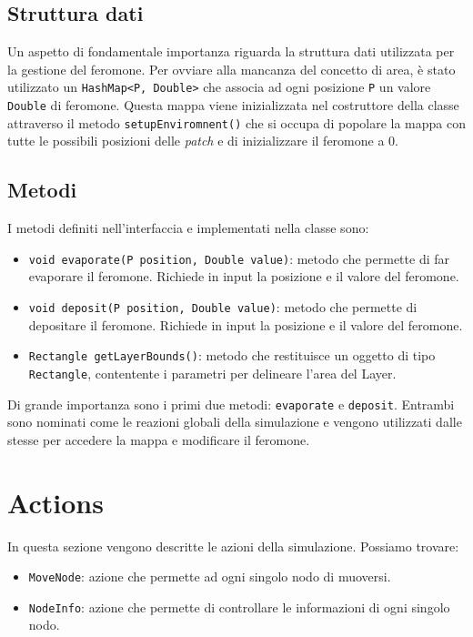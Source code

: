 
\subsection{Struttura dati}\label{strDati}
Un aspetto di fondamentale importanza riguarda la struttura dati utilizzata per la gestione del feromone.
Per ovviare alla mancanza del concetto di area, è stato utilizzato un \texttt{HashMap<P, Double>} che associa ad ogni posizione \texttt{P} un valore \texttt{Double} di feromone.
Questa mappa viene inizializzata nel costruttore della classe attraverso il metodo \texttt{setupEnviromnent()} che si occupa di popolare la mappa
con tutte le possibili posizioni delle \textit{patch} e di inizializzare il feromone a 0.\newline



\subsection{Metodi}
I metodi definiti nell'interfaccia e implementati nella classe sono:
\begin{itemize}
    \item \texttt{void evaporate(P position, Double value)}: metodo che permette di far evaporare il feromone. 
    Richiede in input la posizione e il valore del feromone.
    \item \texttt{void deposit(P position, Double value)}: metodo che permette di depositare il feromone.
     Richiede in input la posizione e il valore del feromone.
    \item \texttt{Rectangle getLayerBounds()}: metodo che restituisce un oggetto di tipo \texttt{Rectangle}, contentente i parametri per delineare l'area del Layer.
\end{itemize}
Di grande importanza sono i primi due metodi: \texttt{evaporate} e \texttt{deposit}.
Entrambi sono nominati come le reazioni globali della simulazione e vengono utilizzati dalle stesse per accedere la mappa e modificare il feromone.\newline


\section{Actions}
In questa sezione vengono descritte le azioni della simulazione. Possiamo trovare:
\begin{itemize}
    \item \texttt{MoveNode}: azione che permette ad ogni singolo nodo di muoversi.
    \item \texttt{NodeInfo}: azione che permette di controllare le informazioni di ogni singolo nodo.
\end{itemize}

